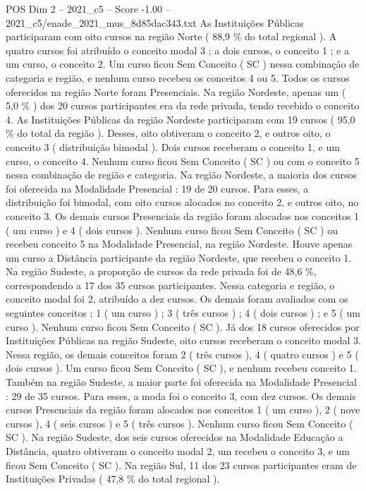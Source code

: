 \begin{textsample}{POS Dim 2 – 2021\_c5 – Score -1.00 – 2021\_c5/enade\_2021\_mus\_8d85dac343.txt}
As Instituições Públicas participaram com oito cursos na região Norte ( 88,9 \% do total regional ).
A quatro cursos foi atribuído o conceito modal 3 ; a dois cursos, o conceito 1 ; e a um curso, o conceito 2.
Um curso ficou Sem Conceito ( SC ) nessa combinação de categoria e região, e nenhum curso recebeu os conceitos 4 ou 5.
Todos os cursos oferecidos na região Norte foram Presenciais.
Na região Nordeste, apenas um ( 5,0 \% ) dos 20 cursos participantes era da rede privada, tendo recebido o conceito 4.
As Instituições Públicas da região Nordeste participaram com 19 cursos ( 95,0 \% do total da região ).
Desses, oito obtiveram o conceito 2, e outros oito, o conceito 3 ( distribuição bimodal ).
Dois cursos receberam o conceito 1, e um curso, o conceito 4.
Nenhum curso ficou Sem Conceito ( SC ) ou com o conceito 5 nessa combinação de região e categoria.
Na região Nordeste, a maioria dos cursos foi oferecida na Modalidade Presencial : 19 de 20 cursos.
Para esses, a distribuição foi bimodal, com oito cursos alocados no conceito 2, e outros oito, no conceito 3.
Os demais cursos Presenciais da região foram alocados nos conceitos 1 ( um curso ) e 4 ( dois cursos ).
Nenhum curso ficou Sem Conceito ( SC ) ou recebeu conceito 5 na Modalidade Presencial, na região Nordeste.
Houve apenas um curso a Distância participante da região Nordeste, que recebeu o conceito 1.
Na região Sudeste, a proporção de cursos da rede privada foi de 48,6 \%, correspondendo a 17 dos 35 cursos participantes.
Nessa categoria e região, o conceito modal foi 2, atribuído a dez cursos.
Os demais foram avaliados com os seguintes conceitos : 1 ( um curso ) ; 3 ( três cursos ) ; 4 ( dois cursos ) ; e 5 ( um curso ).
Nenhum curso ficou Sem Conceito ( SC ).
Já dos 18 cursos oferecidos por Instituições Públicas na região Sudeste, oito cursos receberam o conceito modal 3.
Nessa região, os demais conceitos foram 2 ( três cursos ), 4 ( quatro cursos ) e 5 ( dois cursos ).
Um curso ficou Sem Conceito ( SC ), e nenhum recebeu conceito 1.
Também na região Sudeste, a maior parte foi oferecida na Modalidade Presencial : 29 de 35 cursos.
Para esses, a moda foi o conceito 3, com dez cursos.
Os demais cursos Presenciais da região foram alocados nos conceitos 1 ( um curso ), 2 ( nove cursos ), 4 ( seis cursos ) e 5 ( três cursos ).
Nenhum curso ficou Sem Conceito ( SC ).
Na região Sudeste, dos seis cursos oferecidos na Modalidade Educação a Distância, quatro obtiveram o conceito modal 2, um recebeu o conceito 3, e um ficou Sem Conceito ( SC ).
Na região Sul, 11 dos 23 cursos participantes eram de Instituições Privadas ( 47,8 \% do total regional ).

\end{textsample}

